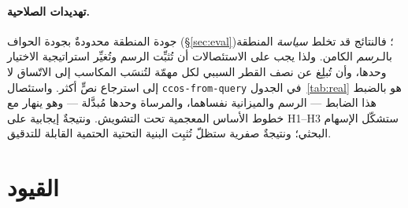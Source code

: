 \documentclass[11pt]{article}
\newcommand{\code}[1]{\textenglish{\texttt{#1}}}
\begin{document}
\paragraph{تهديدات الصلاحية.} جودة المنطقة محدودةٌ بجودة الحواف (\S\ref{sec:eval})؛ فالنتائج
قد تخلط \emph{سياسة} المنطقة بالـ\emph{رسم} الكامن. ولذا يجب على الاستئصالات أن تُثبِّت الرسم
وتُغيِّر استراتيجية الاختيار وحدها، وأن تُبلِغ عن نصف القطر السببي لكل مهمّة لتُنسَب المكاسب
إلى الاتّساق لا إلى استرجاع نصٍّ أكثر. واستئصال \code{ccos-from-query} في الجدول~\ref{tab:real}
هو بالضبط هذا الضابط --- الرسم والميزانية نفساهما، والمرساة وحدها مُبدَّلة --- وهو ينهار مع
خطوط الأساس المعجمية تحت التشويش. ونتيجةٌ إيجابية على H1--H3 ستشكّل الإسهام البحثي؛ ونتيجةٌ
صفرية ستظلّ تُثبِت البنية التحتية الحتمية القابلة للتدقيق.

\section{القيود}
\end{document}
